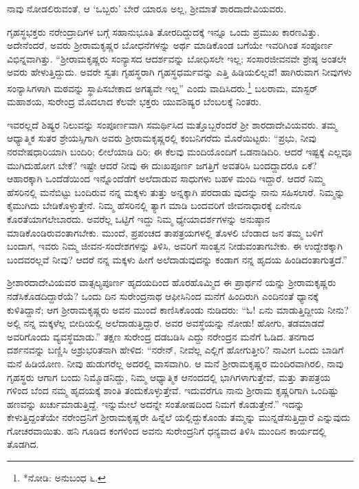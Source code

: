 ನಾವು ನೋಡಲಿರುವಂತೆ, ಆ ‘ಒಬ್ಬರು’ ಬೇರೆ ಯಾರೂ ಅಲ್ಲ, ಶ್ರೀಮಾತೆ ಶಾರದಾದೇವಿಯವರು.

ಗೃಹಸ್ಥಭಕ್ತರು ನರೇಂದ್ರಾದಿಗಳ ಬಗ್ಗೆ ಸಹಾನುಭೂತಿ ತೋರದಿದ್ದುದಕ್ಕೆ ಇನ್ನೂ ಒಂದು ಪ್ರಮುಖ ಕಾರಣವಿತ್ತು. ಅದೇನೆಂದರೆ, ಅವರು ಶ್ರೀರಾಮಕೃಷ್ಣರ ಬೋಧನೆಗಳನ್ನು ಅರ್ಥ ಮಾಡಿಕೊಂಡ ಬಗೆಯೇ ಇವರಿಗಿಂತ ಸಂಪೂರ್ಣ ವಿಭಿನ್ನವಾಗಿತ್ತು. “ಶ್ರೀರಾಮಕೃಷ್ಣರು ಸಂನ್ಯಾಸದ ಆದರ್ಶವನ್ನು ಬೋಧಿಸಲೇ ಇಲ್ಲ; ಸಂಸಾರಜೀವನವೇ ಶ್ರೇಷ್ಠ ಅಂತಲೇ ಅವರು ಹೇಳುತ್ತಿದ್ದುದು. ಅವರೇ ಸ್ವತಃ ಗೃಹಸ್ಥರಾಗಿ ಗೃಹಸ್ಥಧರ್ಮವನ್ನು ಎತ್ತಿ ಹಿಡಿಯಲಿಲ್ಲವೆ! ಹಾಗಿರುವಾಗ ನೀವುಗಳು ಸಂನ್ಯಾಸಿಗಳಾಗಿ ಮಠವನ್ನು ಸ್ಥಾಪಿಸಬೇಕಾದ ಅಗತ್ಯವೇ ಇಲ್ಲ” ಎಂದು ವಾದಿಸಿದರು.\footnote{*ನೋಡಿ: ಅನುಬಂಧ ೬.} ಬಲರಾಮ, ಮಾಸ್ಟರ್ ಮಹಾಶಯ, ಸುರೇಂದ್ರ ಮೊದಲಾದ ಕೆಲವೇ ಭಕ್ತರು ಯುವಶಿಷ್ಯರ ಬೆಂಬಲಕ್ಕೆ ನಿಂತರು.

ಇವರಲ್ಲದೆ ಶಿಷ್ಯರ ನಿಲುವನ್ನು ಸಂಪೂರ್ಣವಾಗಿ ಸಮರ್ಥಿಸಿದ ಮತ್ತೊಬ್ಬರೆಂದರೆ ಶ್ರೀ ಶಾರದಾದೇವಿಯವರು. ತಮ್ಮ ಆಧ್ಯಾತ್ಮಿಕ ಸುತರ ಶ್ರೇಯಸ್ಸಿಗಾಗಿ ಅವರು ಶ್ರೀರಾಮಕೃಷ್ಣರಲ್ಲಿ ಕಂಬನಿಗರೆದು ಮೊರೆಯಿಟ್ಟರು: “ಪ್ರಭು, ನೀವು ನರವೇಷಧಾರಿಯಾಗಿ ಬಂದಿರಿ; ಲೀಲೆಯಾಡಿ ದಿರಿ; ಈ ಕೆಲವು ಮಂದಿಯೊಂದಿಗೆ ಒಡನಾಡಿದಿರಿ. ಆದರೆ ಇಷ್ಟಕ್ಕೆ ಎಲ್ಲವೂ ಮುಗಿದುಹೋಗ ಬೇಕೆ? ಇಷ್ಟೇ ಆದರೆ ನೀವು ಈ ದುಃಖಪೂರ್ಣ ಜಗತ್ತಿಗೆ ಅವತರಿಸಿ ಬಂದದ್ದಾದರೂ ಏಕೆ? ಆಹಾರಕ್ಕಾಗಿ ಒಂದೆಡೆಯಿಂದ ಇನ್ನೊಂದೆಡೆಗೆ ಅಲೆದಾಡುವ ಸಾಧುಗಳು ಬಹಳ ಮಂದಿ ಇದ್ದಾರೆ. ಆದರೆ ನಿಮ್ಮ ಹೆಸರಿನಲ್ಲಿ ಮನೆಬಿಟ್ಟು ಬಂದಿರುವ ನನ್ನ ಮಕ್ಕಳು ತುತ್ತು ಅನ್ನಕ್ಕಾಗಿ ಪರದಾಡು ವುದನ್ನು ನಾನು ಸಹಿಸಲಾರೆ. ನಿಮ್ಮನ್ನು ಕೈಮುಗಿದು ಬೇಡಿಕೊಳ್ಳುತ್ತೇನೆ. ನಿಮ್ಮ ಹೆಸರಿನಲ್ಲಿ ತ್ಯಾಗ ಮಾಡಿ ಬಂದವರಿಗೆ ಜೀವನಾಧಾರಕ್ಕೆ ಏನೇನೂ ಕೊರತೆಯಾಗಲೇಬಾರದು. ಅವರೆಲ್ಲ ಒಟ್ಟಿಗೆ ಇದ್ದು ನಿಮ್ಮ ಧ್ಯೇಯಾದರ್ಶಗಳನ್ನು ಅನುಷ್ಠಾನ ಮಾಡಿಕೊಂಡಿರುವಂತಾಗಬೇಕು. ಮುಂದೆ, ಪ್ರಪಂಚದ ತಾಪತ್ರಯಗಳಲ್ಲಿ ತೊಳಲಿ ಬೆಂಡಾದ ಜನ ತಮ್ಮ ಬಳಿಗೆ ಬಂದಾಗ, ಇವರು ನಿಮ್ಮ ಜೀವನ-ಸಂದೇಶಗಳನ್ನು ತಿಳಿಸಿ, ಅವರಿಗೆ ಸಾಂತ್ವನ ನೀಡುವಂತಾಗಬೇಕು. ಈ ಉದ್ದೇಶಕ್ಕಾಗಿ ಬಂದವರಲ್ಲವೆ ನೀವು? ಆದರೆ ನನ್ನ ಮಕ್ಕಳು ಹೀಗೆ ಅಲೆದಾಡುವುದನ್ನು ಕಂಡಾಗ ನನ್ನ ಹೃದಯ ಹಿಂಡಿದಂತಾಗುತ್ತದೆ.”

ಶ್ರೀಶಾರದಾದೇವಿಯವರ ವಾತ್ಸಲ್ಯಪೂರ್ಣ ಹೃದಯದಿಂದ ಹೊರಹೊಮ್ಮಿದ ಈ ಪ್ರಾರ್ಥನೆ ಯನ್ನು ಶ್ರೀರಾಮಕೃಷ್ಣರು ನಡೆಸಿಕೊಡದಿದ್ದಾರೆಯೆ? ಒಂದು ದಿನ ಸುರೇಂದ್ರನಾಥ ಆಫೀಸಿನಿಂದ ಮನೆಗೆ ಹಿಂದಿರುಗಿ ಎಂದಿನಂತೆ ಧ್ಯಾನಕ್ಕೆ ಕುಳಿತಿದ್ದಾನೆ; ಆಗ ಶ್ರೀರಾಮಕೃಷ್ಣರು ಅವನ ಮುಂದೆ ಕಾಣಿಸಿಕೊಂಡು ನುಡಿದರು: “ಓ! ಏನು ಮಾಡುತ್ತಿದ್ದೀಯ ನೀನು? ಅಲ್ಲಿ ನನ್ನ ಮಕ್ಕಳೆಲ್ಲ ಬೀದಿಯಲ್ಲಿ ಅಲೆದಾಡುತ್ತಿದ್ದಾರೆ. ಅವರ ಅವಸ್ಥೆಯನ್ನು ನೋಡು! ಹೋಗು, ತಡಮಾಡದೆ ಅವರಿಗೊಂದು ವ್ಯವಸ್ಥೆಮಾಡು.” ತಕ್ಷಣ ಸುರೇಂದ್ರ ದಡಬಡಿಸಿ ಎದ್ದು ನರೇಂದ್ರನ ಮನೆಗೆ ಓಡಿದ. ತನಗಾದ ದರ್ಶನವನ್ನು ಬಣ್ಣಿಸಿ ಅಶ್ರುಭರಿತನಾಗಿ ಹೇಳಿದ: “ನರೇನ್, ನೀವೆಲ್ಲ ಎಲ್ಲಿಗೆ ಹೋಗುತ್ತೀರಿ? ನಾವೀಗ ಒಂದು ಬಾಡಿಗೆ ಮನೆ ಹಿಡಿಯೋಣ. ನೀವು ಹುಡುಗರೆಲ್ಲ ಅದರಲ್ಲಿ ವಾಸವಾಗಿರಿ. ಆ ಮನೆ ಶ್ರೀರಾಮಕೃಷ್ಣರ ಮಂದಿರವಾಗಿರಲಿ, ನಾವು ಗೃಹಸ್ಥರು ಆಗಾಗ ಬಂದು ನಿಮ್ಮೊಡನಿದ್ದು, ನಿಮ್ಮ ಆಧ್ಯಾತ್ಮಿಕ ಆನಂದದಲ್ಲಿ ಭಾಗಿಗಳಾಗುತ್ತೇವೆ, ಮತ್ತು ತಾಪತ್ರಯ ಗಳಿಂದ ಬೆಂದ ನಮ್ಮ ಹೃದಯಕ್ಕೆ ಶಾಂತಿ ತಂದುಕೊಳ್ಳುತ್ತೇವೆ. ಇದುವರೆಗೂ ನಾನು ಶ್ರೀರಾಮ ಕೃಷ್ಣರಿಗಾಗಿ ಒಂದಿಷ್ಟು ಹಣವನ್ನು ಖರ್ಚುಮಾಡುತ್ತಿದ್ದೆ. ಇನ್ನುಮೇಲೆ ಅದನ್ನೇ ಸಂತೋಷದಿಂದ ನಿಮಗೆ ಕೊಡುತ್ತೇನೆ.” ಇದನ್ನು ಕೇಳುತ್ತಿದ್ದಂತೆಯೇ ನರೇಂದ್ರನಿಗೆ ಶ್ರೀರಾಮಕೃಷ್ಣರೇ ಹಿನ್ನೆಲೆ ಯಲ್ಲಿದ್ದುಕೊಂಡು ತಮ್ಮನ್ನು ಮುನ್ನಡೆಸುತ್ತಿದ್ದಾರೆ ಎನ್ನುವುದು ಗೋಚರವಾಯಿತು. ಹನಿ ಗೂಡಿದ ಕಂಗಳಿಂದ ಅವನು ಸುರೇಂದ್ರನಿಗೆ ಧನ್ಯವಾದ ತಿಳಿಸಿ ಮುಂದಿನ ಕಾರ್ಯದಲ್ಲಿ ತೊಡಗಿದ.

